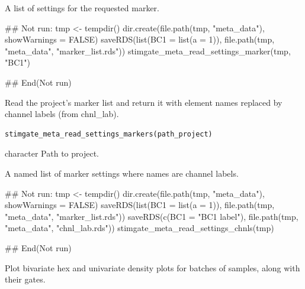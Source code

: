 \documentclass[letterpaper]{book}
\begin{document}
%
\begin{Value}
A list of settings for the requested marker.
\end{Value}
%
\begin{Examples}
\begin{ExampleCode}
## Not run: 
tmp <- tempdir()
dir.create(file.path(tmp, "meta_data"), showWarnings = FALSE)
saveRDS(list(BC1 = list(a = 1)), file.path(tmp, "meta_data", "marker_list.rds"))
stimgate_meta_read_settings_marker(tmp, "BC1")

## End(Not run)
\end{ExampleCode}
\end{Examples}
%
\begin{Description}
Read the project's marker list and return it with element names
replaced by channel labels (from chnl\_lab).
\end{Description}
%
\begin{Usage}
\begin{verbatim}
stimgate_meta_read_settings_markers(path_project)
\end{verbatim}
\end{Usage}
%
\begin{Arguments}
\begin{ldescription}
\item[\code{path\_project}] character Path to project.
\end{ldescription}
\end{Arguments}
%
\begin{Value}
A named list of marker settings where names are channel labels.
\end{Value}
%
\begin{Examples}
\begin{ExampleCode}
## Not run: 
tmp <- tempdir()
dir.create(file.path(tmp, "meta_data"), showWarnings = FALSE)
saveRDS(list(BC1 = list(a = 1)), file.path(tmp, "meta_data", "marker_list.rds"))
saveRDS(c(BC1 = "BC1 label"), file.path(tmp, "meta_data", "chnl_lab.rds"))
stimgate_meta_read_settings_chnls(tmp)

## End(Not run)
\end{ExampleCode}
\end{Examples}
%
\begin{Description}
Plot bivariate hex and univariate density plots for batches of samples, along
with their gates.
\end{Description}
\end{document}
